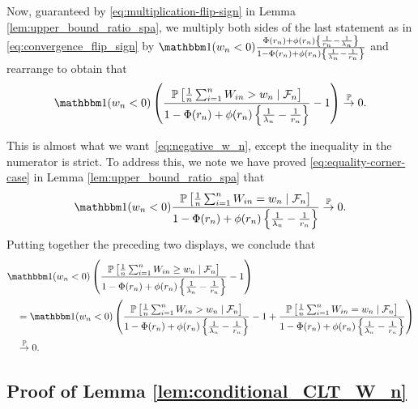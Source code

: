\documentclass[12pt]{article}
\theoremstyle{definition}
\def\P{\mathbb{P}}
\def\P{\mathbb{P}}
\renewcommand{\P}{\mathbb{P}}							%
\newcommand{\indicator}{\mathbbm 1}						%
\newcommand{\convp}{\overset{\mathbb{P}}{\rightarrow}}             %
\begin{document}
Now, guaranteed by \eqref{eq:multiplication-flip-sign} in Lemma \ref{lem:upper_bound_ratio_spa}, we multiply both sides of the last statement as in \eqref{eq:convergence_flip_sign} by $\indicator(w_n < 0)\frac{\Phi(r_n)+\phi(r_n)\left\{\frac{1}{r_n}-\frac{1}{\lambda_n}\right\}}{1 - \Phi(r_n)+\phi(r_n)\left\{\frac{1}{\lambda_n}-\frac{1}{r_n}\right\}}$ and rearrange to obtain that 
\begin{equation*}
\indicator(w_n < 0)\left(\frac{\P\left[\frac1n \sum_{i = 1}^n W_{in} > w_n \mid \mathcal F_n\right]}{1 - \Phi(r_n)+\phi(r_n)\left\{\frac{1}{\lambda_n}-\frac{1}{r_n}\right\}}-1\right) \convp 0.
\end{equation*}

This is almost what we want~\eqref{eq:negative_w_n}, except the inequality in the numerator is strict. To address this, we note we have proved \eqref{eq:equality-corner-case} in Lemma \ref{lem:upper_bound_ratio_spa} that 
\begin{equation*}
\indicator(w_n < 0)\frac{\P\left[\frac1n \sum_{i = 1}^n W_{in} = w_n \mid \mathcal F_n\right]}{1-\Phi(r_n)+\phi(r_n)\left\{\frac{1}{\lambda_n}-\frac{1}{r_n}\right\}} \convp 0.
\end{equation*}
Putting together the preceding two displays, we conclude that
\begin{equation*}
\begin{split}
&\indicator(w_n < 0)\left(\frac{\P\left[\frac1n \sum_{i = 1}^n W_{in} \geq w_n \mid \mathcal F_n\right]}{1-\Phi(r_n)+\phi(r_n)\left\{\frac{1}{\lambda_n}-\frac{1}{r_n}\right\}}-1\right) \\
&\quad = \indicator(w_n < 0)\left(\frac{\P\left[\frac1n \sum_{i = 1}^n W_{in} > w_n \mid \mathcal F_n\right]}{1-\Phi(r_n)+\phi(r_n)\left\{\frac{1}{\lambda_n}-\frac{1}{r_n}\right\}}-1 + \frac{\P\left[\frac1n \sum_{i = 1}^n W_{in} = w_n \mid \mathcal F_n\right]}{1-\Phi(r_n)+\phi(r_n)\left\{\frac{1}{\lambda_n}-\frac{1}{r_n}\right\}}\right) \\
&\quad \convp 0.
\end{split}
\end{equation*}

\subsection{Proof of Lemma \ref{lem:conditional_CLT_W_n}}
\end{document}
